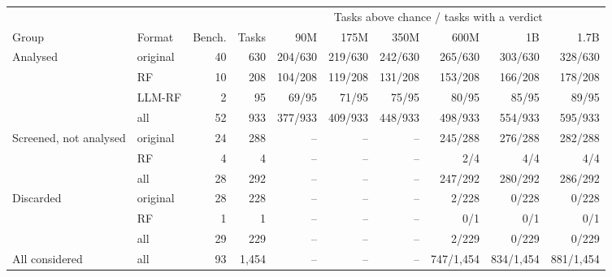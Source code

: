 \begin{tabular}{llrrrrrrrr}
\toprule
 & & & & \multicolumn{6}{c}{Tasks above chance / tasks with a verdict} \\
\cmidrule(lr){5-10}
Group & Format & Bench. & Tasks & 90M & 175M & 350M & 600M & 1B & 1.7B \\
\midrule
Analysed & original & 40 & 630 & 204/630 & 219/630 & 242/630 & 265/630 & 303/630 & 328/630 \\
 & RF & 10 & 208 & 104/208 & 119/208 & 131/208 & 153/208 & 166/208 & 178/208 \\
 & LLM-RF & 2 & 95 & 69/95 & 71/95 & 75/95 & 80/95 & 85/95 & 89/95 \\
 & all & 52 & 933 & 377/933 & 409/933 & 448/933 & 498/933 & 554/933 & 595/933 \\
\midrule
Screened, not analysed & original & 24 & 288 & -- & -- & -- & 245/288 & 276/288 & 282/288 \\
 & RF & 4 & 4 & -- & -- & -- & 2/4 & 4/4 & 4/4 \\
 & all & 28 & 292 & -- & -- & -- & 247/292 & 280/292 & 286/292 \\
\midrule
Discarded & original & 28 & 228 & -- & -- & -- & 2/228 & 0/228 & 0/228 \\
 & RF & 1 & 1 & -- & -- & -- & 0/1 & 0/1 & 0/1 \\
 & all & 29 & 229 & -- & -- & -- & 2/229 & 0/229 & 0/229 \\
\midrule
All considered & all & 93 & 1{,}454 & -- & -- & -- & 747/1{,}454 & 834/1{,}454 & 881/1{,}454 \\
\bottomrule
\end{tabular}
